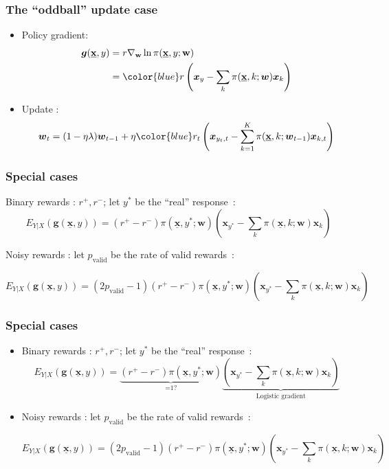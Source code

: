 \documentclass{beamer}
\begin{document}
\begin{frame}\frametitle{The ``oddball'' update case}
  \begin{itemize}
  \item Policy gradient:
  \begin{align}
    \boldsymbol{g}(\underline{\mathbf{x}},y) &= r \nabla_\mathbf{w}\ln\pi(\underline{\mathbf{x}},y;\mathbf{w}) \nonumber \\
    &= {\color{blue}r \left(\boldsymbol{x}_y - \sum_k  \pi(\underline{\mathbf{x}},k;\boldsymbol{w}) \boldsymbol{x}_k \right)}\nonumber
  \end{align}
  \item Update :
  $$
\boldsymbol{w}_t = (1-\eta\lambda) \boldsymbol{w}_{t-1} + \eta{ \color{blue} r_t \left( \boldsymbol{x}_{y_t,t} 
- \sum_{k=1}^K  \pi(\underline{\mathbf{x}},k;\boldsymbol{w}_{t-1}) \boldsymbol{x}_{k,t} \right) }
$$  
\end{itemize}
  
\end{frame}

\begin{frame}\frametitle{Special cases}
\begin{itemize}
	\item Binary rewards : $r^+,r^-$;
	let $y^*$ be the ``real'' response~:
	$$E_{Y|X}(\boldsymbol{g}(\underline{\mathbf{x}},y)) = (r^+ - r^-) \pi(\underline{\mathbf{x}},y^*;\mathbf{w})
	\left(\boldsymbol{x}_{y^*} - \sum_k  \pi(\underline{\mathbf{x}},k;\boldsymbol{w}) \boldsymbol{x}_k \right)$$
	{\color{white}\item Noisy rewards : let $p_\text{valid}$ be the rate of valid rewards~:
	\begin{footnotesize}
	$$E_{Y|X}(\boldsymbol{g}(\underline{\mathbf{x}},y)) = (2 p_\text{valid} - 1) (r^+ - r^-) \pi(\underline{\mathbf{x}},y^*;\mathbf{w})
	\left(\boldsymbol{x}_{y^*} - \sum_k  \pi(\underline{\mathbf{x}},k;\boldsymbol{w}) \boldsymbol{x}_k \right)$$
	\end{footnotesize}}
\end{itemize}
\end{frame}

\begin{frame}\frametitle{Special cases}
	\begin{itemize}
		\item Binary rewards : $r^+,r^-$;
		let $y^*$ be the ``real'' response~:
		$$E_{Y|X}(\boldsymbol{g}(\underline{\mathbf{x}},y)) = \underbrace {(r^+ - r^-) \pi(\underline{\mathbf{x}},y^*;\mathbf{w})}_\text{=1?}
		\underbrace{\left(\boldsymbol{x}_{y^*} - \sum_k  \pi(\underline{\mathbf{x}},k;\boldsymbol{w}) \boldsymbol{x}_k \right)}_\text{Logistic gradient}$$
		\item {\color{white}Noisy rewards : let $p_\text{valid}$ be the rate of valid rewards~:
		\begin{footnotesize}
			$$E_{Y|X}(\boldsymbol{g}(\underline{\mathbf{x}},y)) = (2 p_\text{valid} - 1) (r^+ - r^-) \pi(\underline{\mathbf{x}},y^*;\mathbf{w})
			\left(\boldsymbol{x}_{y^*} - \sum_k  \pi(\underline{\mathbf{x}},k;\boldsymbol{w}) \boldsymbol{x}_k \right)$$
		\end{footnotesize}}
	\end{itemize}
\end{frame}
\end{document}
